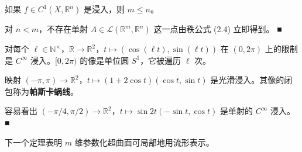 \begin{examplenote}

\begin{items}
\item

如果 $ f \in C^{1}(X, \mathbb{R}^{n}) $ 是浸入，则 $ m \le n $。

\proofhead
对 $ n < m $，不存在单射 $ A \in \mathcal{L}(\mathbb{R}^{m}, \mathbb{R}^{n}) $ 这一点由秩公式 (2.4) 立即得到。 \nobreak\hspace{0.35em}■
\item

对每个 $ \ell \in \mathbb{N}^{\times} $，$ \mathbb{R} \to \mathbb{R}^{2} $，$ t \mapsto (\cos(\ell t), \sin(\ell t)) $ 在 $ (0, 2\pi) $ 上的限制是 $ C^{\infty} $ 浸入。$ [0, 2\pi) $ 的像是单位圆 $ S^{1} $，它被遍历 $ \ell $ 次。

\item

映射 $ (-\pi, \pi) \to \mathbb{R}^{2} $，$ t \mapsto (1 + 2\cos t)(\cos t, \sin t) $ 是光滑浸入。其像的闭包称为\textbf{帕斯卡蜗线}。

\item

容易看出 $ (-\pi/4, \pi/2) \to \mathbb{R}^{2} $，$ t \mapsto \sin 2t(-\sin t, \cos t) $ 是单射的 $ C^{\infty} $ 浸入。 \nobreak\hspace{0.35em}■

\end{items}


下一个定理表明 $ m $ 维参数化超曲面可局部地用流形表示。

\end{examplenote}

